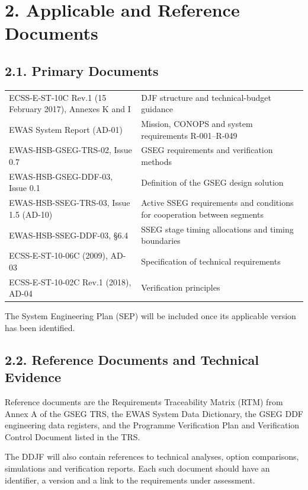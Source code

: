 \section{2. Applicable and Reference Documents}\label{ddjf-2}

\subsection{2.1. Primary Documents}\label{ddjf-2-1}

\begingroup{}
\begin{longtable}{|P{0.43}|P{0.57}|}
\hline{}
 & \\ \hline
\endhead
\hline\endlastfoot
ECSS-E-ST-10C Rev.1 (15 February 2017), Annexes K and I & DJF structure and technical-budget guidance\\ \hline
EWAS System Report (AD-01) & Mission, CONOPS and system requirements R-001–R-049\\ \hline
EWAS-HSB-GSEG-TRS-02, Issue 0.7 & GSEG requirements and verification methods\\ \hline
EWAS-HSB-GSEG-DDF-03, Issue 0.1 & Definition of the GSEG design solution\\ \hline
EWAS-HSB-SSEG-TRS-03, Issue 1.5 (AD-10) & Active SSEG requirements and conditions for cooperation between segments\\ \hline
EWAS-HSB-SSEG-DDF-03, §6.4 & SSEG stage timing allocations and timing boundaries\\ \hline
ECSS-E-ST-10-06C (2009), AD-03 & Specification of technical requirements\\ \hline
ECSS-E-ST-10-02C Rev.1 (2018), AD-04 & Verification principles\\*
\end{longtable}
\endgroup

The System Engineering Plan (SEP) will be included once its applicable version has been identified.

\subsection{2.2. Reference Documents and Technical Evidence}\label{ddjf-2-2}

Reference documents are the Requirements Traceability Matrix (RTM) from Annex A of the GSEG TRS, the EWAS System Data Dictionary, the GSEG DDF engineering data registers, and the Programme Verification Plan and Verification Control Document listed in the TRS.

The DDJF will also contain references to technical analyses, option comparisons, simulations and verification reports. Each such document should have an identifier, a version and a link to the requirements under assessment.
